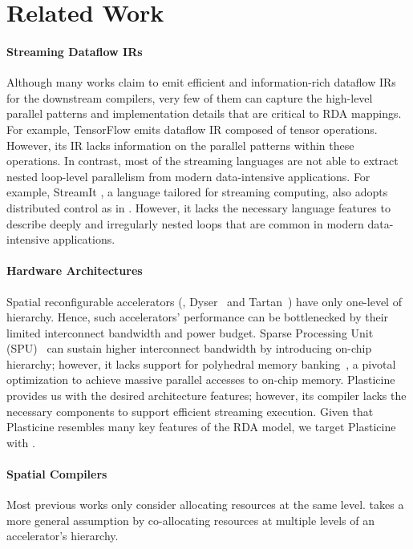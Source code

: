 \section{Related Work}
\label{sec:related}

\paragraph{Streaming Dataflow IRs}
Although many works claim to emit efficient and information-rich dataflow IRs for the downstream compilers, very few of them can capture the high-level parallel patterns and implementation details that are critical to RDA mappings. For example, TensorFlow \cite{tensorflow} emits dataflow IR composed of tensor operations. However, its IR lacks information on the parallel patterns within these operations. In contrast, most of the streaming languages \cite{streamit, synaid, maxj} are not able to extract nested loop-level parallelism from modern data-intensive applications. For example, StreamIt \cite{streamit}, a language tailored for streaming computing, also adopts distributed control as in \name{}. However, it lacks the necessary language features to describe deeply and irregularly nested loops that are common in modern data-intensive applications.

\paragraph{Hardware Architectures}
Spatial reconfigurable accelerators (\eg, Dyser~\cite{dyser} and Tartan~\cite{tartan}) have only one-level of hierarchy.
Hence, such accelerators' performance can be bottlenecked by their limited interconnect bandwidth and power budget.
Sparse Processing Unit (SPU)~\cite{sparseaccel} can sustain higher interconnect bandwidth by introducing on-chip hierarchy; however, it lacks support for polyhedral memory banking~\cite{poly_cong}, a pivotal optimization to achieve massive parallel accesses to on-chip memory. Plasticine~\cite{plasticine} provides us with the desired architecture features; however, its compiler lacks the necessary components to support efficient streaming execution. Given that Plasticine resembles many key features of the RDA model, we target Plasticine with \name{}.

\paragraph{Spatial Compilers}
Most previous works \cite{nowatzki, spatial-computation} only consider allocating resources at the same level. \name{} takes a more general assumption by co-allocating resources at multiple levels of an accelerator's hierarchy.

